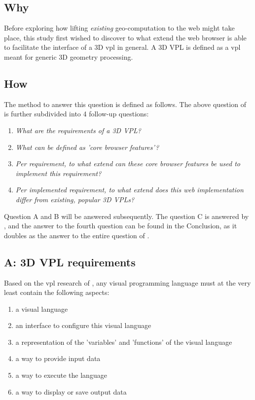 \subsection*{Why}

Before exploring how lifting \emph{existing} geo-computation to the web might take place, this study first wished to discover to what extend the web browser is able to facilitate the interface of a 3D vpl in general.
A 3D VPL is defined as a vpl meant for generic 3D geometry processing.

\subsection*{How}

The method to answer this question is defined as follows. 
The above question of \mySubRQOneTitle is further subdivided into 4 follow-up questions:
\begin{enumerate}[A]
  \item \emph{What are the requirements of a 3D VPL?}
  \item \emph{What can be defined as 'core browser features'?}
  \item \emph{Per requirement, to what extend can these core browser features be used to implement this requirement?}
  \item \emph{Per implemented requirement, to what extend does this web implementation differ from existing, popular 3D VPLs?}
\end{enumerate}

Question A and B will be answered subsequently. 
The question C is answered by , and the answer to the fourth question can be found in the Conclusion, as it doubles as the answer to the entire question of \mySubRQOneTitle.

\subsection*{A: 3D VPL requirements}

Based on the vpl research of , any visual programming language must at the very least contain the following aspects: 
\begin{enumerate}[-]
  \item a visual language
  \item an interface to configure this visual language 
  \item a representation of the 'variables' and 'functions' of the visual language
  \item a way to provide input data 
  \item a way to execute the language
  \item a way to display or save output data
\end{enumerate}

